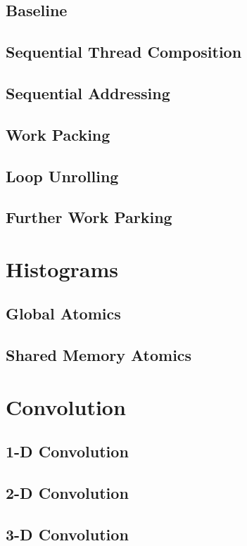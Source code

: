 \documentclass[11pt,fancy,authoryear]{elegantbook}
\begin{document}
\section{Baseline}

\section{Sequential Thread Composition}

\section{Sequential Addressing}

\section{Work Packing}

\section{Loop Unrolling}

\section{Further Work Parking}

\chapter{Histograms}

\section{Global Atomics}

\section{Shared Memory Atomics}

\chapter{Convolution}

\section{1-D Convolution}

\section{2-D Convolution}

\section{3-D Convolution}
\end{document}
